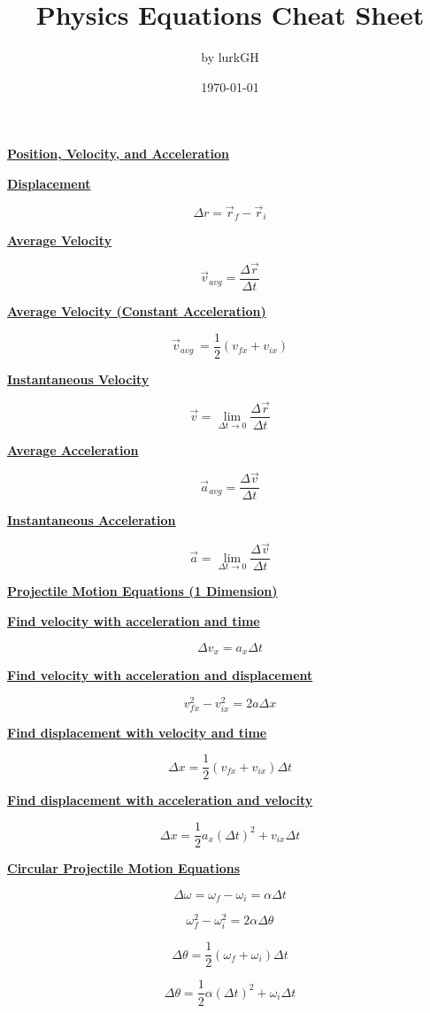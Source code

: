 \documentclass[12pt, letterpaper]{article}
\title{\textbf{Physics Equations Cheat Sheet}}
\author{by lurkGH}
\date{\today}
\begin{document}
\maketitle

\noindent\makebox[\linewidth]{\rule{\paperwidth}{0.4pt}}
\vspace{1em}

\Large{\centerline{\textbf{\underline{Position, Velocity, and Acceleration}}}}
\vspace{1em}

\normalsize{\centerline{\textbf{\underline{Displacement}}}}
\[\Delta r = \vec{r}_f - \vec{r}_i\]

\centerline{\textbf{\underline{Average Velocity}}}
\[\vec{v}_{avg} = \frac{\Delta \vec{r}}{\Delta t}\]

\centerline{\textbf{\underline{Average Velocity (Constant Acceleration)}}}
\[\vec{v}_{avg}\ = \frac{1}{2} (v_{fx} + v_{ix})\]

\centerline{\textbf{\underline{Instantaneous Velocity}}}
\[\vec{v} = \lim_{\Delta t \to 0} \frac{\Delta \vec{r}}{\Delta t}\]

\centerline{\textbf{\underline{Average Acceleration}}}
\[\vec{a}_{avg} = \frac{\Delta \vec{v}}{\Delta t}\]

\centerline{\textbf{\underline{Instantaneous Acceleration}}}
\[\vec{a} = \lim_{\Delta t \to 0} \frac{\Delta \vec{v}}{\Delta t}\]

\newpage

\Large{\centerline{\textbf{\underline{Projectile Motion Equations (1 Dimension)}}}}
\vspace{1em}

\normalsize{\centerline{\textbf{\underline{Find velocity with acceleration and time}}}}
\[\Delta v_x = a_x \Delta t\]

\centerline{\textbf{\underline{Find velocity with acceleration and displacement}}}
\[v^2_{fx} - v^2_{ix} = 2a \Delta x\]

\centerline{\textbf{\underline{Find displacement with velocity and time}}}
\[\Delta x = \frac{1}{2} (v_{fx} + v_{ix}) \Delta t\]

\centerline{\textbf{\underline{Find displacement with acceleration and velocity}}}
\[\Delta x = \frac{1}{2} a_x (\Delta t)^2 + v_{ix} \Delta t\]

\newpage

\Large{\centerline{\textbf{\underline{Circular Projectile Motion Equations}}}}
\vspace{1em}

\[\Delta \omega = \omega_f - \omega_i = \alpha \Delta t\]

\[\omega^2_{f} - \omega^2_{i} = 2 \alpha \Delta \theta \]

\[\Delta \theta = \frac{1}{2} (\omega_{f} + \omega_{i}) \Delta t\]

\[\Delta \theta = \frac{1}{2} \alpha (\Delta t)^2 + \omega_{i} \Delta t\]
\end{document}
